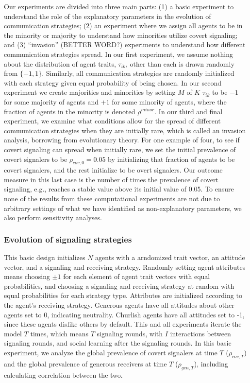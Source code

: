 \documentclass[11pt,letterpaper]{article}
\begin{document}
Our experiments are divided into three main parts: (1) a basic experiment
to understand the role of the explanatory parameters in the evolution of
communication strategies; (2) an experiment where
we assign all agents to be in the
minority or majority to understand how minorities utilize covert signaling;
and (3) ``invasion'' (BETTER WORD?) experiments to understand how different
communication strategies spread. In our first experiment, we assume nothing 
about the distribution of agent traits, $\tau_{ik}$, other than each is 
drawn randomly from $\{-1, 1\}$. Similarly, all communication strategies
are randomly initialized with each strategy given equal probability of
being chosen. In our second experiment we create majorities and minorities
by setting $M$ of $K$ $\tau_{ik}$ to be
$-1$ for some majority of agents and $+1$ for some minority of agents, where
the fraction of agents in the minority is denoted $\rho^{minor}$. 
In our third and final experiment, we examine what conditions allow for the
spread of different communication strategies when they are initially rare,
which is called an invasion analysis, borrowing from evolutionary theory.
For one example of four, to see if covert signaling can spread when initially rare, we
set the initial prevalence of covert signalers to be $\rho_{cov,0}=0.05$ by
initializing that fraction of agents to be covert signalers, and the rest
initialize to be overt signalers. Our outcome measure in this last case is
the number of times the prevalence of covert signaling, e.g., reaches a 
stable value above its initial value of 0.05. To ensure none of the results
from these computational experiments are not due to arbitrary settings of
what we have identified as non-explanatory parameters, we also
perform sensitivity analyses.

\subsubsection{Evolution of signaling strategies}

This basic design initializes $N$ agents with a arndomized trait vector, 
an attitude vector, and a signaling and receiving strategy.
Randomly setting agent attributes means
choosing $\pm 1$ for each element of agent trait vectors with equal 
probabilities, and choosing a signaling and receiving strategy at random
with equal probabilities for each strategy type. Attributes are initialized
according to the agent's receiving strategy. Generous agents have all 
attitudes about other agents set to 0, indicating neutrality. Churlish agents
have all attitudes set to -1, since these agents dislike others by default.
This and all experiments iterate the model $T$ times, which
means $T$ signaling rounds, with $I$ interactions between signaling rounds,
and social learning after the signaling rounds. In this basic experiment,
we analyze the global prevalence of covert signalers at time $T$ ($\rho_{cov,T}$)
and the global prevalence of generous receivers at time $T$ ($\rho_{gen,T}$),
including calculating correlation between the two.
\end{document}

